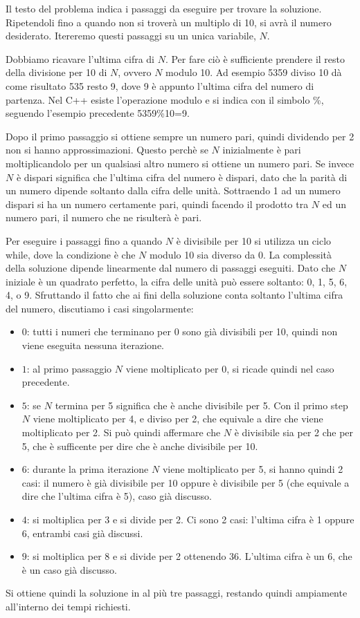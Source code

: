 
Il testo del problema indica i passaggi da eseguire per trovare la soluzione. Ripetendoli fino a quando non si troverà un multiplo di 10, si avrà il numero desiderato. Itereremo questi passaggi su un unica variabile, $N$.

Dobbiamo ricavare l'ultima cifra di $N$. Per fare ciò è sufficiente prendere il resto della divisione per 10 di $N$, ovvero $N$ modulo 10. Ad esempio 5359 diviso 10 dà come risultato 535 resto 9, dove 9 è appunto l'ultima cifra del numero di partenza. Nel C++ esiste l'operazione modulo e si indica con il simbolo \%, seguendo l'esempio precedente 5359\%10=9. 

Dopo il primo passaggio si ottiene sempre un numero pari, quindi dividendo per 2 non si hanno approssimazioni. Questo perchè se $N$ inizialmente è pari moltiplicandolo per un qualsiasi altro numero si ottiene un numero pari. Se invece $N$ è dispari significa che l'ultima cifra del numero è dispari, dato che la parità di un numero dipende soltanto dalla cifra delle unità. Sottraendo 1 ad un numero dispari si ha un numero certamente pari, quindi facendo il prodotto tra $N$ ed un numero pari, il numero che ne risulterà è pari.

Per eseguire i passaggi fino a quando $N$ è divisibile per 10 si utilizza un ciclo while, dove la condizione è che $N$ modulo 10 sia diverso da 0. La complessità della soluzione dipende linearmente dal numero di passaggi eseguiti. Dato che $N$ iniziale è un quadrato perfetto, la cifra delle unità può essere soltanto: 0, 1, 5, 6, 4, o 9. Sfruttando il fatto che ai fini della soluzione conta soltanto l'ultima cifra del numero, discutiamo i casi singolarmente:
\begin{itemize}
		\item $0$: tutti i numeri che terminano per 0 sono già divisibili per 10, quindi non viene eseguita nessuna iterazione.
		\item $1$: al primo passaggio $N$ viene moltiplicato per 0, si ricade quindi nel caso precedente.
		\item $5$: se $N$ termina per 5 significa che è anche divisibile per 5. Con il primo step $N$ viene moltiplicato per 4, e diviso per 2, che equivale a dire che viene moltiplicato per 2. Si può quindi affermare che $N$ è divisibile sia per 2 che per 5, che è sufficente per dire che è anche divisibile per 10.
		\item $6$: durante la prima iterazione $N$ viene moltiplicato per 5, si hanno quindi 2 casi: il numero è già divisibile per 10 oppure è divisibile per 5 (che equivale a dire che l'ultima cifra è 5), caso già discusso.

	\item $4$: si moltiplica per 3 e si divide per 2. Ci sono 2 casi: l'ultima cifra è 1 oppure 6, entrambi casi già discussi.
	
	\item $9$: si moltiplica per 8 e si divide per 2 ottenendo 36. L'ultima cifra è un 6, che è un caso già discusso.
\end{itemize}
Si ottiene quindi la soluzione in al più tre passaggi, restando quindi ampiamente all'interno dei tempi richiesti.

